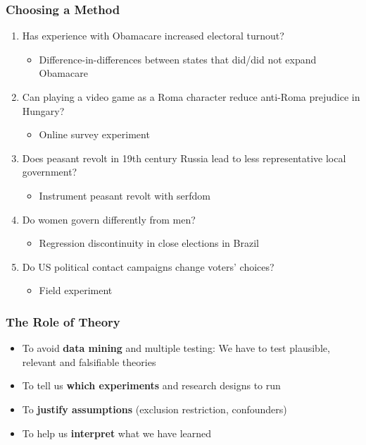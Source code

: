 \documentclass[xcolor=x11names,compress]{beamer}\usepackage[]{graphicx}\usepackage[]{color}
\renewcommand{\(}{\begin{columns}}
\renewcommand{\)}{\end{columns}}
\newcommand{\<}[1]{\begin{column}{#1}}
\renewcommand{\>}{\end{column}}
\begin{document}
\begin{frame}
\frametitle{Choosing a Method}
\begin{enumerate}
\item Has experience with Obamacare increased electoral turnout?
\pause
\begin{itemize}
\item Difference-in-differences between states that did/did not expand Obamacare
\pause
\end{itemize}
\item Can playing a video game as a Roma character reduce anti-Roma prejudice in Hungary?
\pause
\begin{itemize}
\item Online survey experiment
\pause
\end{itemize}
\item Does peasant revolt in 19th century Russia lead to less representative local government?
\pause
\begin{itemize}
\item Instrument peasant revolt with serfdom
\pause
\end{itemize}
\item Do women govern differently from men? 
\pause
\begin{itemize}
\item Regression discontinuity in close elections in Brazil
\pause
\end{itemize}
\item Do US political contact campaigns change voters' choices?
\pause
\begin{itemize}
\item Field experiment
\pause
\end{itemize}
\end{enumerate}
\end{frame}

\begin{frame}
\frametitle{The Role of Theory}
\begin{itemize}
\item To avoid \textbf{data mining} and multiple testing: We have to test plausible, relevant and falsifiable theories
\pause
\item To tell us \textbf{which experiments} and research designs to run
\pause
\item To \textbf{justify assumptions} (exclusion restriction, confounders)
\pause
\item To help us \textbf{interpret} what we have learned
\end{itemize}
\end{frame}
\end{document}
